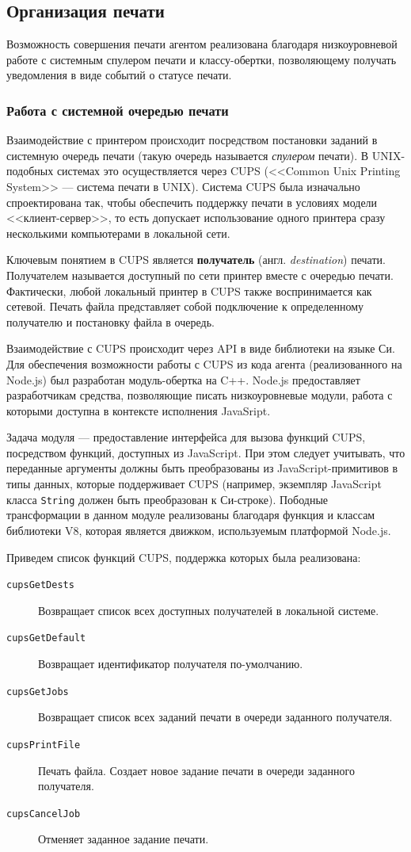 \documentclass[a4paper,14pt,href]{article}
\begin{document}
\subsection{Организация печати}
Возможность совершения печати агентом реализована благодаря низкоуровневой работе с системным спулером печати и классу-обертки,
позволяющему получать уведомления в виде событий о статусе печати.

\subsubsection{Работа с системной очередью печати}
Взаимодействие с принтером происходит посредством постановки заданий в системную очередь печати (такую очередь называется
\textit{спулером} печати). В UNIX-подобных системах это осуществляется через CUPS (<<Common Unix Printing System>> ---
система печати в UNIX). Система CUPS была изначально спроектирована так, чтобы обеспечить поддержку печати в условиях
модели <<клиент-сервер>>, то есть допускает использование одного принтера сразу несколькими компьютерами в локальной сети.

Ключевым понятием в CUPS является \textbf{получатель} (англ. \textit{destina\-ti\-on}) печати. Получателем называется
доступный по сети принтер вместе с очередью печати. Фактически, любой локальный принтер в CUPS также воспринимается как
сетевой. Печать файла представляет собой подключение к определенному получателю и постановку файла в очередь.

Взаимодействие с CUPS происходит через API в виде библиотеки на языке Си\cite{CUPSAPI}. Для обеспечения возможности работы с CUPS
из кода агента (реализованного на Node.js) был разработан модуль-обертка на C++. Node.js предоставляет разработчикам
средства, позволяющие писать низкоуровневые модули, работа с которыми доступна в контексте исполнения JavaSript\cite{NodeJSAddons}.

Задача модуля --- предоставление интерфейса для вызова функций CUPS, посредством функций, доступных из JavaScript.
При этом следует учитывать, что переданные аргументы должны быть преобразованы из JavaScript-примитивов в типы данных,
которые поддерживает CUPS (например, экземпляр JavaScript класса \texttt{String} должен быть преобразован к Си-строке).
Пободные трансформации в данном модуле реализованы благодаря функция и классам библиотеки V8, которая является движком,
используемым платформой Node.js.

Приведем список функций CUPS, поддержка которых была реализована:
\begin{description}
  \item[\texttt{cupsGetDests}] Возвращает список всех доступных получателей в локальной системе.
  \item[\texttt{cupsGetDefault}] Возвращает идентификатор получателя по-умолчанию.
  \item[\texttt{cupsGetJobs}] Возвращает список всех заданий печати в очереди заданного получателя.
  \item[\texttt{cupsPrintFile}] Печать файла. Создает новое задание печати в очереди заданного получателя.
  \item[\texttt{cupsCancelJob}] Отменяет заданное задание печати.
\end{description}
\end{document}
